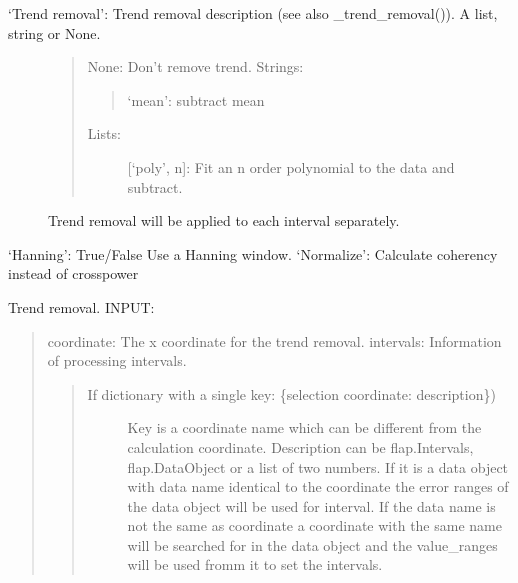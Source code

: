 \documentclass[letterpaper,10pt,english]{sphinxmanual}
\begin{document}
\begin{fulllineitems}
\begin{fulllineitems}
\begin{description}
\begin{description}
\begin{description}
\item[{‘Trend removal’: Trend removal description (see also \_trend\_removal()). A list, string or None.}] \leavevmode\begin{quote}

None: Don’t remove trend.
Strings:
\begin{quote}

‘mean’: subtract mean
\end{quote}
\begin{description}
\item[{Lists:}] \leavevmode
{[}‘poly’, n{]}: Fit an n order polynomial to the data and subtract.

\end{description}
\end{quote}

Trend removal will be applied to each interval separately.

\end{description}

‘Hanning’: True/False Use a Hanning window.
‘Normalize’: Calculate coherency instead of crosspower

\end{description}

\end{description}

\end{fulllineitems}


\begin{fulllineitems}
\label{\detokenize{data_object:flap.data_object.DataObject.detrend}}
Trend removal.
INPUT:
\begin{quote}

coordinate: The x coordinate for the trend removal.
intervals: Information of processing intervals.
\begin{quote}
\begin{description}
\item[{If dictionary with a single key: \{selection coordinate: description\})}] \leavevmode
Key is a coordinate name which can be different from the calculation
coordinate.
Description can be flap.Intervals, flap.DataObject or
a list of two numbers. If it is a data object with data name identical to
the coordinate the error ranges of the data object will be used for
interval. If the data name is not the same as coordinate a coordinate with the
same name will be searched for in the data object and the value\_ranges
will be used fromm it to set the intervals.


\end{description}
\end{quote}
\end{quote}
\end{fulllineitems}
\end{fulllineitems}
\end{document}

